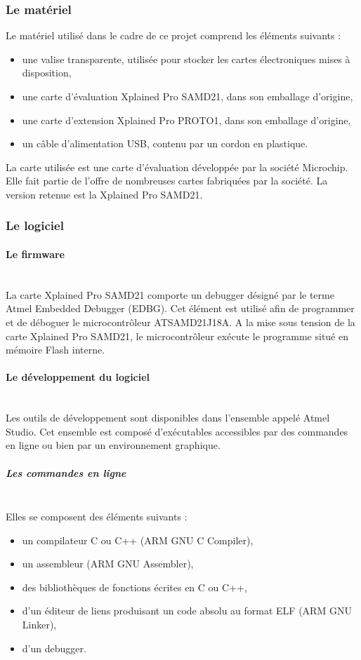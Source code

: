 \documentclass[a4paper]{article}
\begin{document}
	\subsubsection{Le matériel}
	Le matériel utilisé dans le cadre de ce projet comprend les éléments suivants :
	\begin{itemize}
		\item une valise transparente, utilisée pour stocker les cartes électroniques mises à disposition,
		\item une carte d’évaluation Xplained Pro SAMD21, dans son emballage d’origine,
		\item une carte d’extension Xplained Pro PROTO1, dans son emballage d’origine,
		\item un câble d’alimentation USB, contenu par un cordon en plastique.
	\end{itemize}
	La carte utilisée est une carte d’évaluation développée par la société Microchip. Elle fait partie de l’offre de nombreuses cartes fabriquées par la société. La version retenue est la Xplained Pro SAMD21.
	\subsubsection{Le logiciel}
	\paragraph{Le firmware}~~\\
	La carte Xplained Pro SAMD21 comporte un debugger désigné par le terme Atmel Embedded Debugger (EDBG). Cet élément est utilisé afin de programmer et de déboguer le microcontrôleur ATSAMD21J18A. A la mise sous tension de la carte Xplained Pro SAMD21, le microcontrôleur exécute le programme situé en mémoire Flash interne.
	\paragraph{Le développement du logiciel}~~\\
	Les outils de développement sont disponibles dans l’ensemble appelé Atmel Studio. Cet ensemble est composé d’exécutables accessibles par des commandes en ligne ou bien par un environnement graphique.
	\subparagraph{Les commandes en ligne}~~\\
	Elles se composent des éléments suivants :
	\begin{itemize}
		\item un compilateur C ou C++ (ARM GNU C Compiler),
		\item un assembleur (ARM GNU Assembler),
		\item des bibliothèques de fonctions écrites en C ou C++,
		\item d’un éditeur de liens produisant un code absolu au format ELF (ARM GNU Linker),
		\item d’un debugger.
	\end{itemize}
	
\end{document}
